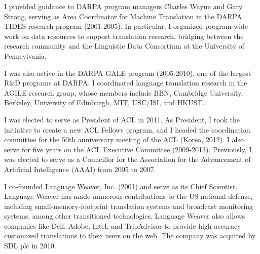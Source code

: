 \noindent
I provided guidance to DARPA program managers Charles Wayne and Gary 
Strong, serving as Area Coordinator for Machine Translation in the 
DARPA TIDES research program (2001-2005).  In particular, I organized 
program-wide work on data resources to support translation research,
bridging between the research community and the Linguistic Data
Consortium at the University of Pennsylvania.

I was also active in the DARPA GALE program (2005-2010), one of
the largest R\&D programs at DARPA.  I coordinated language translation 
research in the AGILE research group, whose members include BBN, 
Cambridge University, Berkeley, University of Edinburgh, MIT, USC/ISI, 
and HKUST.


\noindent
I was elected to serve as President of ACL in 2011.  As President, 
I took the initiative to create a new ACL Fellows program, and
I headed the coordination committee for the 50th anniversary meeting 
of the ACL (Korea, 2012).
I also serve for five years on the ACL Executive Committee (2009-2013).
Previously, I was elected to serve as a Councillor for 
the Association for the Advancement of Artificial Intelligence (AAAI) 
from 2005 to 2007.


\noindent
I co-founded Language Weaver, Inc. (2001) and serve as its Chief Scientist.  
Language Weaver has made numerous contributions
to the US national defense, including small-memory-footprint 
translation systems and broadcast monitoring systems, 
among other transitioned technologies.  Language Weaver
also allows companies like Dell, Adobe, Intel, and TripAdvisor to
provide high-accuracy customized translations to their users on the web.
The company was acquired by SDL plc in 2010.



